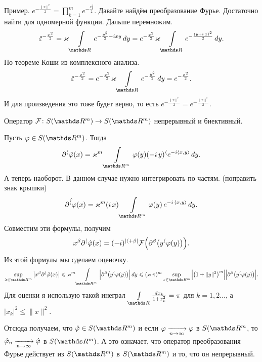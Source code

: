 Пример. $e^{-\frac{\|x\|^2}2} = \prod\limits_{k=1}^me^{-\frac{x_k^2}2}$. Давайте найдём преобразование Фурье. Достаточно найти для одномерной функции. Дальше перемножим.
\[
  \hat\e^{-\frac{x^2}2} = \varkappa\Gint\R e^{-\frac{y^2}2-ixy}\,dy = 
  e^{-\frac {x^2}2}\varkappa\Gint\R e^{-\frac{(y+i\,x)^2}2}\,dy.
\]
По теореме Коши из комплексного анализа.
\[\hat\e^{-\frac{x^2}2} = 
  e^{-\frac{x^2}2}\varkappa\Gint\R e^{-\frac{y^2}2}\,dy = e^{-\frac{x^2}2}.
\]
И для произведения это тоже будет верно, то есть 
$e^{-\frac{\|x\|^2}2}=e^{-\frac{\|x\|^2}2}$.
\begin{Lem}
  Оператор $\mathcal F\colon S(\R^m)\to S(\R^m)$ непрерывный и биективный.
\end{Lem}
\begin{Proof}
  Пусть $\phi\in S(\R^m)$. Тогда 
\[
\dl^\a\hat\phi(x) = \varkappa^m\Gint{\R^m}\phi(y)(-i\,y)^\a e^{-i\la x,y\ra}\,dy.
\]
А теперь наоборот. В данном случае нужно интегрировать по частям. (поправить знак крышки)
\[
  \hat{\dl^\a\phi}(x) = \varkappa^m(i\,x)\Gint{\R^m}\phi(y)\,e^{-i\,\la x,y\ra}\,dy.
\]
Совместим эти формулы, получим
\[
  x^\beta\partial^\langle\hat{\varphi}(x) = (-i)^{|\langle+\beta|}\mathcal F\Big(\partial^\beta\big(y^\langle\varphi(y)\big)\Big).
\]
Из этой формулы мы сделаем оценочку.
\[
  \sup\limits_{\l\in\R^m}\big|x^\b\dl^\a\hat\phi(x)\big|\le\varkappa^m\Gint{\R^m}\Big|\dl^\b\big(y^\a\phi(y)\big)\Big|\,dy\le
  (\varkappa\,\pi)^m\sup\limits_{x\in\R^m} \Big|\big(1+\|y\|^2\big)^m\Big|\Big|\dl^\b\big(y^\a\phi(y)\big)\Big|.
\]
Для оценки я использую такой инеграл $\Gint\R\frac{dx_k}{1+x_k^2} = \pi$ для $k=1,2\dots$, а $|x_k|^2\le \|x\|^2$.

Отсюда получаем, что $\hat\phi\in S(\R^m)$ и если $\varphi\xrightarrow[n\rightarrow\infty]{}\varphi$ в $S(\R^m$, то $\hat{\varphi}_n\xrightarrow[n\rightarrow\infty]{} \hat{\varphi}$ в $S(\R^m)$. А это означает, что оператор преобразования Фурье действует из $S(\R^m)$ в $S(\R^m)$ и то, что он непрерывный.


\end{Proof}
